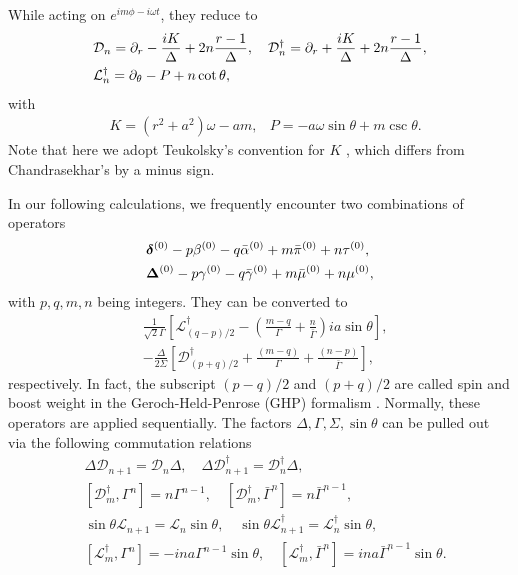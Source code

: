 \documentclass[aps,prd,amsmath,floats,floatfix, twocolumn,
superscriptaddress,nofootinbib,showpacs]{revtex4-1}
\begin{document}
While acting on $e^{im\phi -i\omega t}$, they reduce to
\begin{align}
    &\mathcal{D}_n=\partial_r-\frac{iK}{\Delta}+2n\frac{r-1}{\Delta}, \quad \mathcal{D}_n^\dagger=\partial_r+\frac{iK}{\Delta}+2n\frac{r-1}{\Delta}, \notag \\
    &\mathcal{L}_n^\dagger=\partial_\theta-{P}+n\cot\theta, \notag 
\end{align}
with 
\begin{align}
    &K=(r^2+a^2)\omega-am,
    &{P}=-a\omega \sin\theta+m\csc\theta.
\end{align}
Note that here we adopt Teukolsky's convention for $K$ \cite{Teukolsky:1973ApJ}, which differs from Chandrasekhar's by a minus sign.

In our following calculations, we frequently  encounter two combinations of operators
\begin{align}
    &\bm{\delta}^{(0)}-p\beta^{(0)}-q\bar{\alpha}^{(0)}+m\bar{\pi}^{(0)}+n\tau^{(0)},\notag \\
    &\bm{\Delta}^{(0)}-p\gamma^{(0)}-q\bar{\gamma}^{(0)}+m\bar{\mu}^{(0)}+n\mu^{(0)}, \notag 
\end{align}
with $p,q,m,n$ being integers. They can be converted to
\begin{subequations}
\begin{align}
    &\frac{1}{\sqrt{2}\Gamma}\left[\mathcal{L}^\dagger_{(q-p)/2}-\left(\frac{m-q}{\Gamma}+\frac{n}{\bar{\Gamma}}\right)ia\sin\theta\right], \\
    &-\frac{\Delta}{2\Sigma}\left[\mathcal{D}^\dagger_{(p+q)/2}+\frac{(m-q)}{\Gamma}+\frac{(n-p)}{\bar{\Gamma}}\right],
\end{align}
\end{subequations}
respectively. In fact, the subscript $(p-q)/2$ and $(p+q)/2$ are called spin and boost weight in the Geroch-Held-Penrose (GHP) formalism \cite{penrose1984spinors}. Normally, these operators are applied sequentially. The factors  $\Delta,\Gamma,\Sigma,\sin\theta$ can be pulled out via the following commutation relations \cite{chandrasekhar1998mathematical}
\begin{equation}
\label{eq:commutation_relation_D_L}
\begin{aligned}
    &\Delta \mathcal{D}_{n+1}=\mathcal{D}_n \Delta, \quad \Delta \mathcal{D}_{n+1}^\dagger=\mathcal{D}_n^\dagger \Delta, \\
    &\left[\mathcal{D}_{m}^\dagger,\Gamma^n\right]=n \Gamma^{n-1}, \quad \left[\mathcal{D}_{m}^\dagger,\bar{\Gamma}^n\right]=n \bar{\Gamma}^{n-1},\\
    &\sin\theta\mathcal{L}_{n+1}=\mathcal{L}_{n}\sin\theta,  \quad \sin\theta\mathcal{L}^\dagger_{n+1}=\mathcal{L}^\dagger_{n}\sin\theta,  \\
    &\left[\mathcal{L}_{m}^\dagger,\Gamma^n\right]=-ina \Gamma^{n-1}\sin\theta, \quad \left[\mathcal{L}_{m}^\dagger,\bar{\Gamma}^n\right]=ina \bar{\Gamma}^{n-1}\sin\theta.
\end{aligned}
\end{equation}
\end{document}

